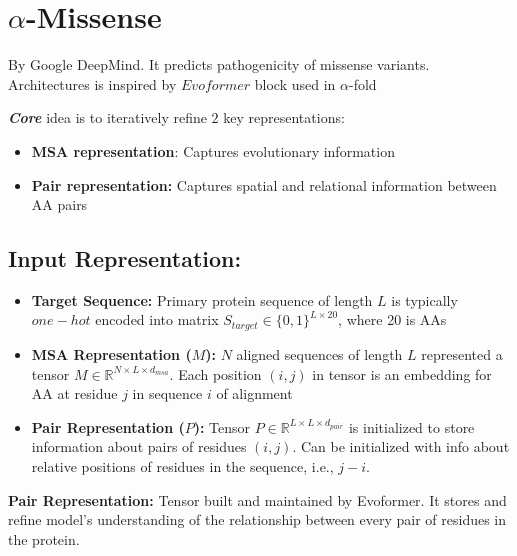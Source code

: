 \documentclass[../main.tex]{subfiles}
\begin{document}
\hrulefill

\cite{doi:10.1126/science.adg7492} \cite{Jumper2021}
\section*{$\alpha$-Missense} 
By Google DeepMind. It predicts pathogenicity of missense variants. Architectures is inspired by $Evoformer$ block used in $\alpha$-fold 

\vspace{0.3cm}

\textit{\textbf{Core}} idea is to iteratively refine $2$ key representations:
\begin{itemize}
    \item \textbf{MSA representation}: Captures evolutionary information
    \item \textbf{Pair representation:} Captures spatial and relational information between AA pairs
\end{itemize}

\subsection*{Input Representation:}

\begin{itemize}
    \item \textbf{Target Sequence:} Primary protein sequence of length $L$ is typically $one-hot$ encoded into matrix $S_{target} \in \{0, 1\}^{L \times 20}$, where 20 is AAs
    \item \textbf{MSA Representation ($M$):} $N$ aligned sequences of length $L$ represented a tensor $M \in \mathbb{R}^{N \times L \times d_{msa}}$. Each position $(i, j)$ in tensor is an embedding for AA at residue $j$ in sequence $i$ of alignment
    \item \textbf{Pair Representation ($P$):} Tensor $P \in \mathbb{R}^{L \times L \times d_{pair}}$ is initialized to store information about pairs of residues $(i, j)$. Can be initialized with info about relative positions of residues in the sequence, i.e., $j - i$.
\end{itemize}

\textbf{Pair Representation:} Tensor built and maintained by Evoformer. It stores and refine model's understanding of the relationship between every pair of residues in the protein.

\vspace{0.3cm}
\end{document}
